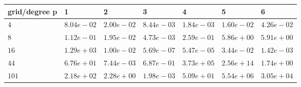 \begin{tabular}{lllllll}
\hline
 grid/degree p   & 1          & 2          & 3          & 4          & 5          & 6          \\
\hline
 $4$             & $8.04e-02$ & $2.00e-02$ & $8.44e-03$ & $1.84e-03$ & $1.60e-02$ & $4.26e-02$ \\
 $8$             & $1.12e-01$ & $1.95e-02$ & $4.73e-03$ & $2.59e-01$ & $5.86e+00$ & $5.91e+00$ \\
 $16$            & $1.29e+03$ & $1.00e-02$ & $5.69e-07$ & $5.47e-05$ & $3.44e-02$ & $1.42e-03$ \\
 $44$            & $6.76e+01$ & $7.44e-03$ & $6.87e-01$ & $3.73e+05$ & $2.56e+14$ & $1.74e+00$ \\
 $101$           & $2.18e+02$ & $2.28e+00$ & $1.98e-03$ & $5.09e+01$ & $5.54e+06$ & $3.05e+04$ \\
\hline
\end{tabular}